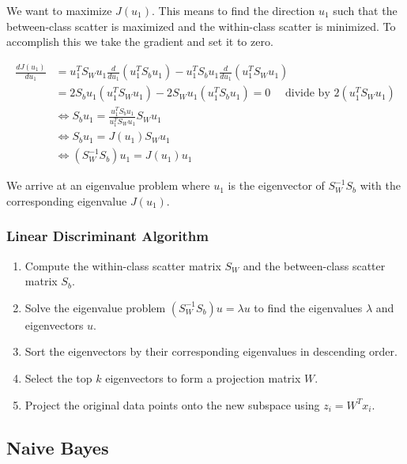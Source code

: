 We want to maximize \(J(u_1)\). This means to find the direction \(u_1\) such that the between-class scatter is maximized and the 
within-class scatter is minimized. To accomplish this we take the gradient and set it to zero. 

\begin{align*} 
    \frac{d J(u_1)}{du_1} &= u_1^T S_W u_1 \frac{d}{du_1} (u_1^T S_b u_1) - u_1^T S_b u_1 \frac{d}{du_1} (u_1^T S_W u_1) \\ 
    &= 2 S_b u_1 (u_1^T S_W u_1) - 2 S_W u_1 (u_1^T S_b u_1) = 0 \quad \text{ divide by } 2 (u_1^T S_W u_1)\\
    &\iff S_b u_1 = \frac{u_1^T S_b u_1}{u_1^T S_W u_1} S_W u_1 \\
    &\iff S_b u_1 = J(u_1) S_W u_1 \\ 
    &\iff (S_W^{-1} S_b) u_1 = J(u_1) u_1
\end{align*}

We arrive at an eigenvalue problem where \(u_1\) is the eigenvector of \(S_W^{-1} S_b\) with the corresponding 
eigenvalue \(J(u_1)\).

\subsubsection{Linear Discriminant Algorithm}

\begin{enumerate}

    \item Compute the within-class scatter matrix \(S_W\) and the between-class scatter matrix \(S_b\).

    \item Solve the eigenvalue problem \((S_W^{-1} S_b) u = \lambda u\) to find the eigenvalues \(\lambda\) and eigenvectors \(u\).

    \item Sort the eigenvectors by their corresponding eigenvalues in descending order.

    \item Select the top \(k\) eigenvectors to form a projection matrix \(W\).

    \item Project the original data points onto the new subspace using \(z_i = W^T x_i\).   

\end{enumerate}

\subsection{Naive Bayes}

